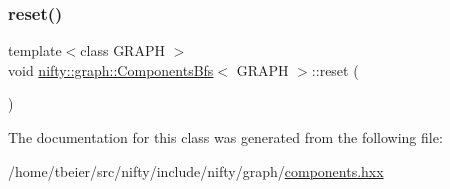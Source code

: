 \subsubsection{\texorpdfstring{reset()}{reset()}}
{\footnotesize\ttfamily template$<$class G\+R\+A\+PH $>$ \\
void \hyperlink{classnifty_1_1graph_1_1ComponentsBfs}{nifty\+::graph\+::\+Components\+Bfs}$<$ G\+R\+A\+PH $>$\+::reset (\begin{DoxyParamCaption}{ }\end{DoxyParamCaption})\hspace{0.3cm}{\ttfamily [inline]}}



The documentation for this class was generated from the following file\+:\begin{DoxyCompactItemize}
\item 
/home/tbeier/src/nifty/include/nifty/graph/\hyperlink{components_8hxx}{components.\+hxx}\end{DoxyCompactItemize}
